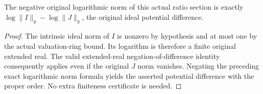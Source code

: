 \begin{corollary}
\label{cor:actual-cartier-ratio-model-weight}
\leanok
{}
The negative original logarithmic norm of this actual ratio
section is exactly
$\log\|I\|_y-\log\|J\|_y$, the original ideal potential difference.
\end{corollary}
\begin{proof}
The intrinsic ideal norm of $I$ is nonzero by hypothesis and at
most one by the actual valuation-ring bound. Its logarithm is
therefore a finite original extended real. The valid extended-real
negation-of-difference identity consequently applies even if the
original $J$ norm vanishes. Negating the preceding exact logarithmic
norm formula yields the asserted potential difference with the
proper order. No extra finiteness certificate is needed.
\end{proof}
